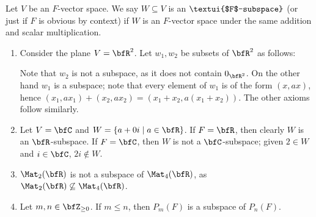     \begin{definition}
        Let $V$ be an $F$-vector space. We say $W \subseteq V$ is an $\textui{$F$-subspace}$ (or just  if $F$ is obvious by context) if $W$ is an $F$-vector space under the same addition and scalar multiplication.
    \end{definition}

    \begin{example}
        \phantom{a}
        \begin{enumerate}[label = (\arabic*)]
            \item Consider the plane $V = \bfR^2$. Let $w_1, w_2$ be subsets of $\bfR^2$ as follows: 
            \begin{center}
            \end{center}
        Note that $w_2$ is not a subspace, as it does not contain $0_{\bfR^2}$. On the other hand $w_1$ is a subspace; note that every element of $w_1$ is of the form $(x,ax)$, hence $(x_1,a x_1) + (x_2, a x_2) = (x_1 + x_2 , a(x_1 + x_2))$. The other axioms follow similarly.

        \item Let $V = \bfC$ and $W = \{a + 0i \mid a \in \bfR\}$. If $F = \bfR$, then clearly $W$ is an $\bfR$-subspace. If $F = \bfC$, then $W$ is not a $\bfC$-subspace; given $2 \in W$ and $i \in \bfC$, $2i \not\in W$.
        \item $\Mat_2{(\bfR)}$ is not a subspace of $\Mat_4{(\bfR)}$, as $\Mat_2{(\bfR)} \not\subseteq \Mat_4{(\bfR)}$.
        \item Let $m,n \in \bfZ_{\geq 0}$. If $m \leq n$, then $P_m(F)$ is a subspace of $P_n(F)$.
        \end{enumerate}
    \end{example}

